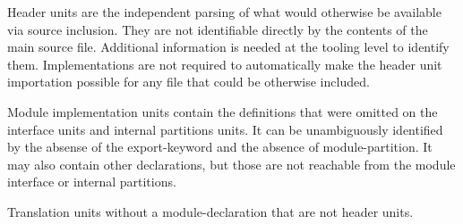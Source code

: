 %
%
%
Header units are the independent parsing of what would otherwise be
available via source inclusion. They are not identifiable directly by
the contents of the main source file. Additional information is needed
at the tooling level to identify them. Implementations are not
required to automatically make the header unit importation possible
for any file that could be otherwise included.

%
%
%
Module implementation units contain the definitions that were omitted
on the interface units and internal partitions units. It can be
unambiguously identified by the absense of the export-keyword and the
absence of module-partition. It may also contain other declarations,
but those are not reachable from the module interface or internal
partitions.

%
%
%
Translation units without a module-declaration that are not header
units.

%

